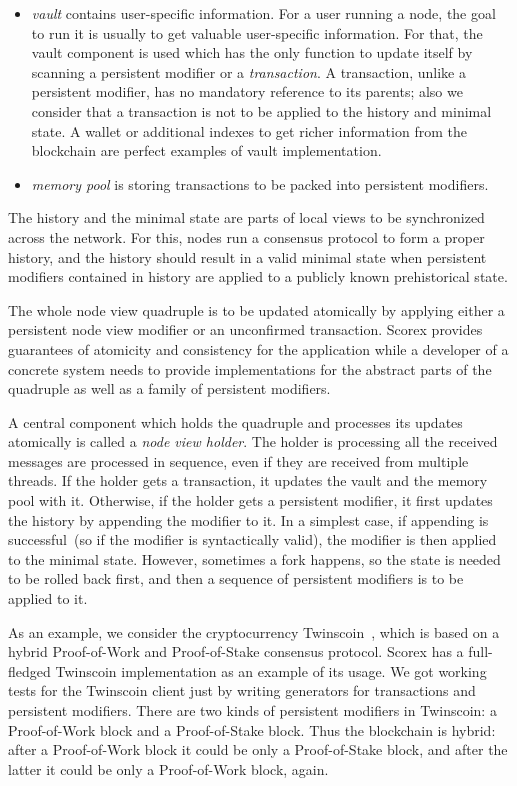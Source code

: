 \begin{itemize}
\item{\em vault} contains user-specific information. For a user running a node, the goal to run it is usually to get valuable user-specific information. For that, the vault component is used which has the only function to update itself by scanning a persistent modifier or a {\em transaction}. A transaction, unlike a persistent modifier, has no mandatory reference to its parents; also we consider that a transaction is not to be applied to the history and minimal state. A wallet or additional indexes to get richer information from the blockchain are perfect examples of vault implementation. 
\item{\em memory pool} is storing transactions to be packed into persistent modifiers.
\end{itemize}

The history and the minimal state are parts of local views to be synchronized across the network. For this, nodes run a consensus protocol to form a proper history, and the history should result in a valid minimal state when persistent modifiers contained in history are applied to a publicly known prehistorical state.

The whole node view quadruple is to be updated atomically by applying either a persistent node view modifier or an unconfirmed transaction. Scorex provides guarantees of atomicity and consistency for the application while a developer of a concrete system needs to provide implementations for the abstract parts of the quadruple as well as a family of persistent modifiers.

A central component which holds the quadruple {\em <history, minimal state, vault, memory pool>} and processes its updates atomically is called a {\em node view holder}. The holder is processing all the received messages are processed in sequence, even if they are received from multiple threads. If the holder gets a transaction, it updates the vault and the memory pool with it. Otherwise, if the holder gets a persistent modifier, it first updates the history by appending the modifier to it. In a simplest case, if appending is successful~(so if the modifier is syntactically valid), the modifier is then applied to the minimal state. However, sometimes a fork happens, so the state is needed to be rolled back first, and then a sequence of persistent modifiers is to be applied to it. 

As an example, we consider the cryptocurrency Twinscoin~\cite{cryptoeprint:2017:232}, which is based on a hybrid Proof-of-Work and Proof-of-Stake consensus protocol. Scorex has a full-fledged Twinscoin implementation as an example of its usage. We got working tests for the Twinscoin client just by writing generators for transactions and persistent modifiers. There are two kinds of persistent modifiers in Twinscoin: a Proof-of-Work block and a Proof-of-Stake block. Thus the blockchain is hybrid: after a Proof-of-Work block it could be only a Proof-of-Stake block, and after the latter it could be only a Proof-of-Work block, again.   
